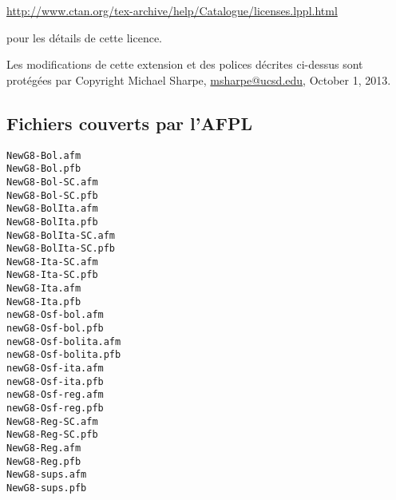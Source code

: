 \documentclass[12pt,english,french]{article}
\begin{document}
\noindent\url{http://www.ctan.org/tex-archive/help/Catalogue/licenses.lppl.html}

\noindent pour les détails de cette licence.

Les modifications de cette extension et des polices décrites ci-dessus sont protégées par Copyright Michael Sharpe, \href{mailto:msharpe@ucsd.edu}{msharpe@ucsd.edu}, October 1, 2013.


\subsection{Fichiers couverts par l'AFPL}

\begin{verbatim}
NewG8-Bol.afm
NewG8-Bol.pfb
NewG8-Bol-SC.afm
NewG8-Bol-SC.pfb
NewG8-BolIta.afm
NewG8-BolIta.pfb
NewG8-BolIta-SC.afm
NewG8-BolIta-SC.pfb
NewG8-Ita-SC.afm
NewG8-Ita-SC.pfb
NewG8-Ita.afm
NewG8-Ita.pfb
newG8-Osf-bol.afm
newG8-Osf-bol.pfb
newG8-Osf-bolita.afm
newG8-Osf-bolita.pfb
newG8-Osf-ita.afm
newG8-Osf-ita.pfb
newG8-Osf-reg.afm
newG8-Osf-reg.pfb
NewG8-Reg-SC.afm
NewG8-Reg-SC.pfb
NewG8-Reg.afm
NewG8-Reg.pfb
NewG8-sups.afm
NewG8-sups.pfb
\end{verbatim}
\end{document}
